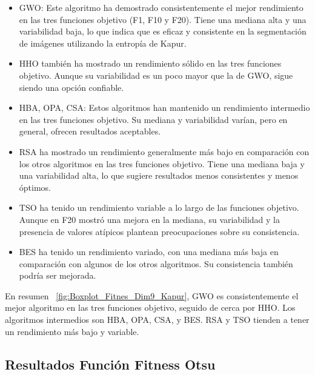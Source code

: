 \documentclass[conference]{IEEEtran}
\begin{document}
\begin{itemize}

\item GWO: Este algoritmo ha demostrado consistentemente el mejor rendimiento en las tres funciones objetivo (F1, F10 y F20). Tiene una mediana alta y una variabilidad baja, lo que indica que es eficaz y consistente en la segmentación de imágenes utilizando la entropía de Kapur.

\item HHO también ha mostrado un rendimiento sólido en las tres funciones objetivo. Aunque su variabilidad es un poco mayor que la de GWO, sigue siendo una opción confiable.

\item HBA, OPA, CSA: Estos algoritmos han mantenido un rendimiento intermedio en las tres funciones objetivo. Su mediana y variabilidad varían, pero en general, ofrecen resultados aceptables.

\item RSA ha mostrado un rendimiento generalmente más bajo en comparación con los otros algoritmos en las tres funciones objetivo. Tiene una mediana baja y una variabilidad alta, lo que sugiere resultados menos consistentes y menos óptimos.

\item TSO ha tenido un rendimiento variable a lo largo de las funciones objetivo. Aunque en F20 mostró una mejora en la mediana, su variabilidad y la presencia de valores atípicos plantean preocupaciones sobre su consistencia.

\item BES ha tenido un rendimiento variado, con una mediana más baja en comparación con algunos de los otros algoritmos. Su consistencia también podría ser mejorada.
\end{itemize}
\noindent En resumen ~\ref{fig:Boxplot_Fitnes_Dim9_Kapur}, GWO es consistentemente el mejor algoritmo en las tres funciones objetivo, seguido de cerca por HHO. Los algoritmos intermedios son HBA, OPA, CSA, y BES. RSA y TSO tienden a tener un rendimiento más bajo y variable.
\subsection{Resultados Función Fitness Otsu}
\end{document}
